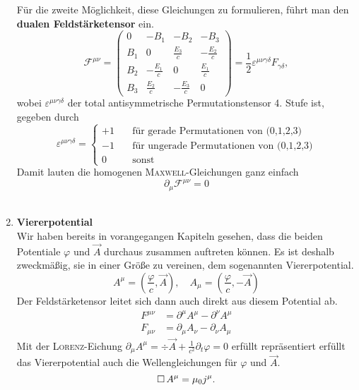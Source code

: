 \begin{enumerate}
Für die zweite Möglichkeit, diese Gleichungen zu formulieren, führt man den \textbf{dualen Feldstärketensor} ein.
\begin{equation*}
\mathcal{F}^{\mu\nu}=\begin{pmatrix}
0 & -B_1 & -B_2 & -B_3 \\
B_1 & 0 & \frac{E_3}{c} & -\frac{E_2}{c}\\
B_2 & -\frac{E_1}{c} & 0 & \frac{E_1}{c} \\
B_3 & \frac{E_2}{c} & -\frac{E_3}{c} & 0 
\end{pmatrix} = \frac{1}{2}\varepsilon^{\mu\nu\gamma\delta}F_{\gamma\delta},
\end{equation*}
wobei $\varepsilon^{\mu\nu\gamma\delta}$ der total antisymmetrische Permutationstensor 4. Stufe ist, gegeben durch
\begin{equation*}
\varepsilon^{\mu\nu\gamma\delta} = \left\lbrace \begin{array}{rl}
+1 \quad & \text{für gerade Permutationen von (0,1,2,3)}\\
-1 \quad & \text{für ungerade Permutationen von (0,1,2,3)} \\
0 \quad & \text{sonst}
\end{array}\right. 
\end{equation*}
Damit lauten die homogenen \textsc{Maxwell}-Gleichungen ganz einfach
\begin{equation*}
\partial_\mu \mathcal{F}^{\mu\nu}=0
\end{equation*}
\ \\

\item \textbf{ Viererpotential}\\

Wir haben bereits in vorangegangen Kapiteln gesehen, dass die beiden Potentiale $\varphi$ und $\vec{A}$ durchaus zusammen auftreten können. Es ist deshalb zweckmäßig, sie in einer Größe zu vereinen, dem sogenannten Viererpotential.
\begin{equation*}
A^\mu = \left(\frac{\varphi}{c},\vec{A}\right),\quad A_\mu = \left(\frac{\varphi}{c},-\vec{A}\right)
\end{equation*}
Der Feldstärketensor leitet sich dann auch direkt aus diesem Potential ab.
\begin{align*}
F^{\mu\nu} & = \partial^\mu A^\mu - \partial^\nu A^\mu\\
F_{\mu\nu} & = \partial_\mu A_\nu - \partial_\nu A_\mu
\end{align*}
Mit der \textsc{Lorenz}-Eichung $\partial_\mu A^\mu = \div\vec{A}+\frac{1}{c^2}\partial_t\varphi=0$ erfüllt repräsentiert erfüllt das Viererpotential auch die Wellengleichungen für $\varphi$ und $\vec{A}$.
\begin{equation*}
\mathop{{}\Box}\nolimits A^\mu = \mu_0j^\mu.
\end{equation*}
\end{enumerate}

